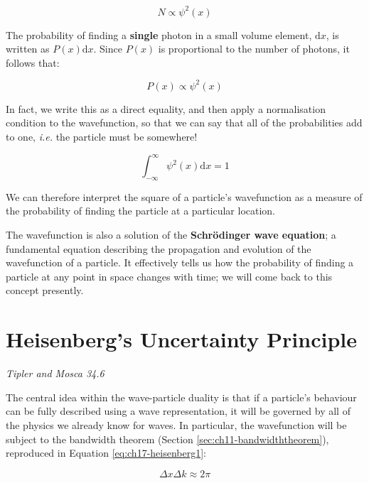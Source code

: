 \documentclass[
]{book}
\begin{document}
\begin{equation}
N \propto \psi^2 (x)
\end{equation}

The probability of finding a \textbf{single} photon in a small volume element, \(\textrm{d}x\), is written as \(P(x) \mathrm{d}x\). Since \(P(x)\) is proportional to the number of photons, it follows that:

\begin{equation}
P(x) \propto \psi^2 (x)
\end{equation}

In fact, we write this as a direct equality, and then apply a normalisation condition to the wavefunction, so that we can say that all of the probabilities add to one, \emph{i.e.} the particle must be somewhere!

\begin{equation}
\int_{-\infty}^{\infty} \psi^2 (x) \mathrm{d}x = 1
\end{equation}

We can therefore interpret the square of a particle's wavefunction as a measure of the probability of finding the particle at a particular location.

The wavefunction is also a solution of the \textbf{Schrödinger wave equation}; a fundamental equation describing the propagation and evolution of the wavefunction of a particle. It effectively tells us how the probability of finding a particle at any point in space changes with time; we will come back to this concept presently.

\hypertarget{sec:ch17-heisenberg1}{%
\section{Heisenberg's Uncertainty Principle}\label{sec:ch17-heisenberg1}}

\emph{Tipler and Mosca 34.6}

The central idea within the wave-particle duality is that if a particle's behaviour can be fully described using a wave representation, it will be governed by all of the physics we already know for waves. In particular, the wavefunction will be subject to the bandwidth theorem (Section \ref{sec:ch11-bandwidththeorem}), reproduced in Equation \eqref{eq:ch17-heisenberg1}:

\begin{equation}
 \Delta x \Delta k \approx 2\pi
 \label{eq:ch17-heisenberg1}
\end{equation}
\end{document}
